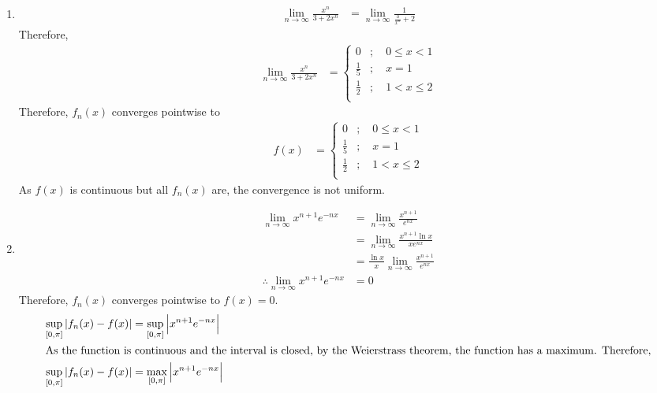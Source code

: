 \documentclass[fleqn, a4paper, 12pt, oneside]{amsart}
\theoremstyle{definition}
\theoremstyle{theorem}
\begin{document}
\begin{solution}
	\begin{enumerate}[leftmargin = *]
		\item
			\begin{align*}
				\lim\limits_{n \to \infty} \frac{x^n}{3 + 2 x^n} &= \lim\limits_{n \to \infty} \frac{1}{\frac{3}{x^n} + 2}
			\end{align*}
			Therefore,
			\begin{align*}
				\lim\limits_{n \to \infty} \frac{x^n}{3 + 2 x^n} &=
					\begin{cases}
						0           & ;\quad 0 \le x < 1 \\
						\frac{1}{5} & ;\quad x = 1       \\
						\frac{1}{2} & ;\quad 1 < x \le 2 \\
					\end{cases}
			\end{align*}
			Therefore, $f_n(x)$ converges pointwise to
			\begin{align*}
				f(x) &=
					\begin{cases}
						0           & ;\quad 0 \le x < 1 \\
						\frac{1}{5} & ;\quad x = 1       \\
						\frac{1}{2} & ;\quad 1 < x \le 2 \\
					\end{cases}
			\end{align*}
			As $f(x)$ is continuous but all $f_n(x)$ are, the convergence is not uniform.
		\item
			\begin{align*}
				\lim\limits_{n \to \infty} x^{n + 1} e^{-n x} &= \lim\limits_{n \to \infty} \frac{x^{n + 1}}{e^{n x}}\\
				&= \lim\limits_{n \to \infty} \frac{x^{n + 1} \ln x}{x e^{n x}}\\
				&= \frac{\ln x}{x} \lim\limits_{n \to \infty} \frac{x^{n + 1}}{e^{n x}}\\
				\therefore \lim\limits_{n \to \infty} x^{n + 1} e^{-n x} &= 0
			\end{align*}
			Therefore, $f_n(x)$ converges pointwise to $f(x) = 0$.
			\begin{align*}
				\sup\limits_{[0,\pi]} |f_n(x) - f(x)| &= \sup\limits_{[0,\pi]} \left| x^{n + 1} e^{-n x} \right|\\
				\intertext{As the function is continuous and the interval is closed, by the Weierstrass theorem, the function has a maximum. Therefore,}
				\sup\limits_{[0,\pi]} |f_n(x) - f(x)| &= \max\limits_{[0,\pi]} \left| x^{n + 1} e^{-n x} \right|

\end{align*}
\end{enumerate}
\end{solution}
\end{document}
